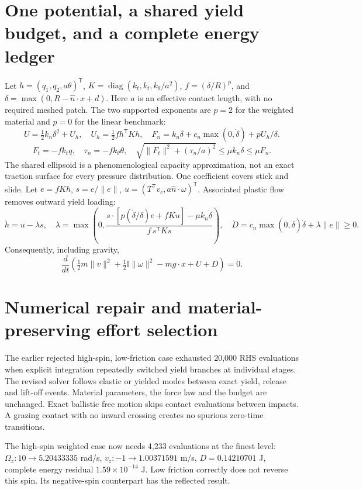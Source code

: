 \documentclass[10pt]{article}
\begin{document}
\section*{One potential, a shared yield budget, and a complete energy ledger}
Let $h=(q_1,q_2,a\theta)^\mathsf T$, $K=\operatorname{diag}(k_t,k_t,k_\theta/a^2)$, $f=(\delta/R)^p$, and $\delta=\max(0,R-\hat n\cdot x+d)$. Here $a$ is an effective contact length, with no required meshed patch. The two supported exponents are $p=2$ for the weighted material and $p=0$ for the linear benchmark:
\[
U=\tfrac12k_n\delta^2+U_h,\quad U_h=\tfrac12f h^\mathsf TKh,\quad
F_n=k_n\delta+c_n\max(0,\dot\delta)+pU_h/\delta.
\]
\[
F_t=-fk_tq,\quad\tau_n=-fk_\theta\theta,\quad
\sqrt{\|F_t\|^2+(\tau_n/a)^2}\leq\mu k_n\delta\leq\mu F_n.
\]
The shared ellipsoid is a phenomenological capacity approximation, not an exact traction surface for every pressure distribution. One coefficient covers stick and slide. Let $e=fKh$, $s=e/\|e\|$, $u=(T^\mathsf Tv_c,a\hat n\cdot\omega)^\mathsf T$. Associated plastic flow removes outward yield loading:
\[
\dot h=u-\lambda s,\quad
\lambda=\max\left(0,\frac{s\cdot[p(\dot\delta/\delta)e+fKu]-\mu k_n\dot\delta}{f\,s^\mathsf TKs}\right),\quad
\dot D=c_n\max(0,\dot\delta)\dot\delta+\lambda\|e\|\geq0.
\]
Consequently, including gravity,
\[
\frac{d}{dt}\left(\tfrac12m\|v\|^2+\tfrac12\mathbb I\|\omega\|^2-mg\cdot x+U+D\right)=0.
\]
\newpage
\section*{Numerical repair and material-preserving effort selection}
The earlier rejected high-spin, low-friction case exhausted 20,000 RHS evaluations when explicit integration repeatedly switched yield branches at individual stages. The revised solver follows elastic or yielded modes between exact yield, release and lift-off events. Material parameters, the force law and the budget are unchanged. Exact ballistic free motion skips contact evaluations between impacts. A grazing contact with no inward crossing creates no spurious zero-time transitions.

The high-spin weighted case now needs 4,233 evaluations at the finest level: $\Omega_z:10\to5.20433335$ rad/s, $v_z:-1\to1.00371591$ m/s, $D=0.14210701$ J, complete energy residual $1.59\times10^{-14}$ J. Low friction correctly does not reverse this spin. Its negative-spin counterpart has the reflected result.
\end{document}
